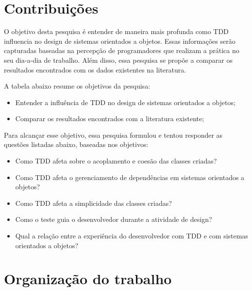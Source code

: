 \section{Contribuições}

O objetivo desta pesquisa é entender de maneira mais profunda como TDD
influencia no design de sistemas orientados a objetos. Essas informações serão
capturadas baseadas na percepção de programadores que realizam a prática no seu
dia-a-dia de trabalho. Além disso, essa pesquisa se propõe a comparar os
resultados encontrados com os dados existentes na literatura.

A tabela abaixo resume os objetivos da pesquisa:

\begin{itemize}
  \item Entender a influência de TDD no design de sistemas orientados a objetos;

  \item Comparar os resultados encontrados com a literatura existente;
\end{itemize}

Para alcançar esse objetivo, essa pesquisa formulou e tentou responder as
questões listadas abaixo, baseadas nos objetivos:

\begin{itemize}
  \item Como TDD afeta sobre o acoplamento e coesão das classes
  criadas?
  
  \item Como TDD afeta o gerenciamento de dependências em sistemas orientados a
  objetos?

  \item Como TDD afeta a simplicidade das classes criadas?

  \item Como o teste guia o desenvolvedor durante a atividade de
  design?

  \item Qual a relação entre a experiência do desenvolvedor com TDD e
  com sistemas orientados a objetos?
\end{itemize}

\section{Organização do trabalho}

